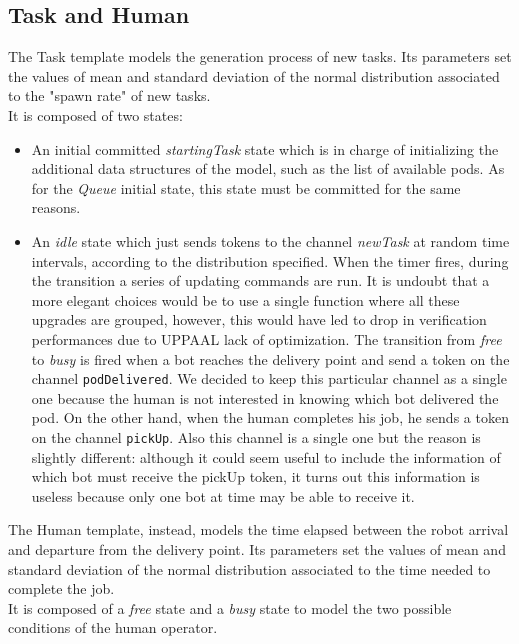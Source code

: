 \documentclass{article}
\begin{document}
		\subsection{Task and Human}
			The Task template models the generation process of new tasks. Its parameters set the values of mean and standard deviation of the normal distribution associated to the "spawn rate" of new tasks.\\
			It is composed of two states:
			\begin{itemize}
				\item An initial committed \emph{startingTask} state which is in charge of initializing the additional data structures of the model, such as the list of available pods. As for the \emph{Queue} initial state, this state must be committed for the same reasons.
				\item An \emph{idle} state which just sends tokens to the channel \emph{newTask} at random time intervals, according to the distribution specified. When the timer fires, during the transition a series of updating commands are run. It is undoubt that a more elegant choices would be to use a single function where all these upgrades are grouped, however, this would have led to drop in verification performances due to UPPAAL lack of optimization. The transition from \emph{free} to \emph{busy} is fired when a bot reaches the delivery point and send a token on the channel \verb|podDelivered|. We decided to keep this particular channel as a single one because the human is not interested in knowing which bot delivered the pod. On the other hand, when the human completes his job, he sends a token on the channel \verb|pickUp|. Also this channel is a single one but the reason is slightly different: although it could seem useful to include the information of which bot must receive the pickUp token, it turns out this information is useless because only one bot at time may be able to receive it.
			\end{itemize}
			The Human template, instead, models the time elapsed between the robot arrival and departure from the delivery point. Its parameters set the values of mean and standard deviation of the normal distribution associated to the time needed to complete the job.\\
			It is composed of a \emph{free} state and a \emph{busy} state to model the two possible conditions of the human operator. 
			
\end{document}

